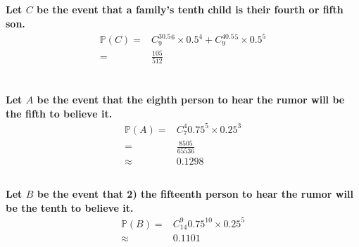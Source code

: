 \documentclass{article}
\begin{document}
        \subsection{}
            \paragraph{
                Let $C$ be the event that a family’s tenth child is their fourth or fifth son.
                \begin{equation*}
                    \begin{split}
                        \mathbb{P}(C)=&C_{9}^30.5^6\times 0.5^4+C_{9}^40.5^5\times 0.5^5\\
                            =&\frac{105}{512}
                    \end{split}
                \end{equation*}
            }
    
    \section{}
        \subsection{}
            \paragraph{
                Let $A$ be the event that the eighth person to hear the rumor will be the fifth to believe it.
                \begin{equation*}
                    \begin{split}
                        \mathbb{P}(A)=&C_{7}^4 0.75^5\times 0.25^3\\
                            =&\frac{8505}{65536}\\
                            \approx&0.1298
                    \end{split}
                \end{equation*}
            }

        \subsection{}
            \paragraph{
                Let $B$ be the event that 2) the fifteenth person to hear the rumor will be the tenth to believe it.
                \begin{equation*}
                    \begin{split}
                        \mathbb{P}(B)=&C_{14}^9 0.75^{10}\times 0.25^5\\
                            \approx&0.1101
                    \end{split}
                \end{equation*}
            }
    
\end{document}
